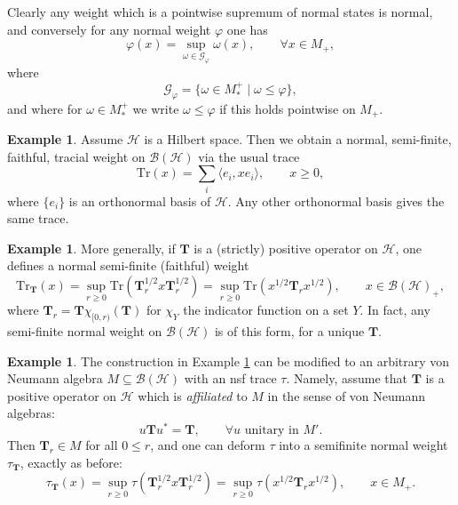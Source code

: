 \documentclass[11pt, reqno]{amsart}
\theoremstyle{definition}
\newtheorem{example}[theorem]{Example}
\numberwithin{equation}{section}
\def\Hc{\mathcal H}
\newcommand{\Hsp}{\mathcal{H}}
\newcommand{\Bc}{\mathcal{B}}
\newcommand{\Tr}{\mathrm{Tr}}
\newcommand{\Tb}{\mathbf{T}}
\begin{document}
Clearly any weight which is a pointwise supremum of normal states is normal, and conversely for any normal weight $\varphi$ one has
\[
\varphi(x) = \sup_{\omega\in \mathcal{G}_{\varphi}}\omega(x),\qquad \forall x\in M_+,
\]
where
\[
\mathcal{G}_{\varphi} = \{\omega \in M_*^+\mid \omega \leq \varphi\},
\]
and where for $\omega \in M_*^+$ we write $\omega \leq \varphi$ if this holds pointwise on $M_+$. 

\begin{example}
Assume $\Hc$ is a Hilbert space. Then we obtain a normal, semi-finite, faithful, tracial weight on $\Bc(\Hc)$ via the usual trace 
\begin{equation}\label{EqTrace}
\Tr(x) = \sum_i \langle e_i,xe_i\rangle,\qquad x\geq0,
\end{equation}
where $\{e_i\}$ is an orthonormal basis of $\Hc$. Any other orthonormal basis gives the same trace. 
\end{example}

\begin{example}\label{ExaTwistTraceBH}
More generally, if $\Tb$ is a (strictly) positive operator on $\Hc$, one defines a normal semi-finite (faithful) weight
\begin{equation}\label{EqDeformTraceOrd}
\Tr_{\Tb}(x) = \sup_{r\geq0} \Tr(\Tb_r^{1/2}x\Tb_r^{1/2}) =\sup_{r\geq 0} \Tr(x^{1/2}\Tb_rx^{1/2}),\qquad x\in \Bc(\Hsp)_+,
\end{equation}
where $\Tb_r = \Tb \chi_{[0,r)}(\Tb)$ for $\chi_Y$ the indicator function on a set $Y$. In fact, any semi-finite normal weight on $\Bc(\Hsp)$ is of this form, for a unique $\Tb$. 
\end{example}

\begin{example} 
The construction in Example \ref{ExaTwistTraceBH} can be modified to an arbitrary von Neumann algebra $M \subseteq \Bc(\Hc)$ with an nsf trace $\tau$. Namely, assume that $\Tb$ is a positive operator on $\Hc$ which is \emph{affiliated} to $M$ in the sense of von Neumann algebras:
\begin{equation}\label{EqAffiliation}
u\Tb u^* = \Tb,\qquad \forall u \textrm{ unitary in }M'. 
\end{equation}
Then $\Tb_r \in M$ for all $0\leq r$, and one can deform $\tau$ into a semifinite normal weight $\tau_{\Tb}$, exactly as before:
\begin{equation}\label{EqDeformTrace}
\tau_{\Tb}(x) = \sup_{r\geq0} \tau(\Tb_r^{1/2}x\Tb_r^{1/2}) =\sup_{r\geq 0} \tau(x^{1/2}\Tb_rx^{1/2}),\qquad x\in M_+.
\end{equation}
\end{example}
\end{document}
